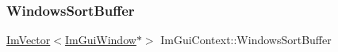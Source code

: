 \hypertarget{struct_im_gui_context_af33de778de28b057fa7a42e4cbe0017a}{}\label{struct_im_gui_context_af33de778de28b057fa7a42e4cbe0017a} 
\subsubsection{\texorpdfstring{Windows\+Sort\+Buffer}{WindowsSortBuffer}}
{\footnotesize\ttfamily \hyperlink{class_im_vector}{Im\+Vector}$<$\hyperlink{struct_im_gui_window}{Im\+Gui\+Window}$\ast$$>$ Im\+Gui\+Context\+::\+Windows\+Sort\+Buffer}

